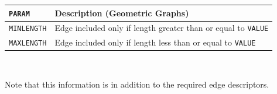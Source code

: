 \documentclass[a4paper,11pt]{report}
\begin{document}
{{{\begin{description}
\begin{description}
\begin{center}
\begin{tabular}{|l|l|}\hline
\texttt{PARAM}&
Description (Geometric Graphs)\\
\hline
\hline
\texttt{MINLENGTH}&
 Edge included only if length greater than or equal to \texttt{VALUE} \\
\hline
\texttt{MAXLENGTH}&
 Edge included only if length less than or equal to \texttt{VALUE} \\
\hline
\end{tabular}\\[2mm]
\end{center}

 Note that this information is in addition to the required edge descriptors. 
\end{description}
 
\end{description}
 }

 
}}
\end{document}

